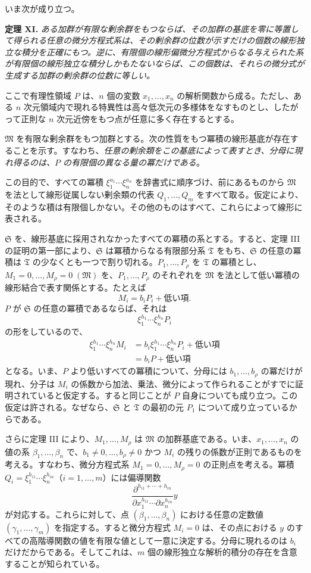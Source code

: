 いま次が成り立つ。

\textbf{定理 XI.} \emph{ある加群が有限な剰余群をもつならば、その加群の基底を零に等置して得られる任意の微分方程式系は、その剰余群の位数が示すだけの個数の線形独立な積分を正確にもつ。逆に、有限個の線形偏微分方程式からなる与えられた系が有限個の線形独立な積分しかもたないならば、この個数は、それらの微分式が生成する加群の剰余群の位数に等しい。}

ここで有理性領域 $P$ は、$n$ 個の変数 $x_1,\ldots,x_n$ の解析関数から成る。ただし、ある $n$ 次元領域内で現れる特異性は高々低次元の多様体をなすものとし、したがって正則な $n$ 次元近傍をもつ点が任意に多く存在するとする。

$\mathfrak M$ を有限な剰余群をもつ加群とする。次の性質をもつ冪積の線形基底が存在することを示す。すなわち、\emph{任意の剰余類をこの基底によって表すとき、分母に現れ得るのは、$P$ の有限個の異なる量の冪だけである}。

この目的で、すべての冪積 $\xi_1^{a_1}\cdots\xi_n^{a_n}$ を辞書式に順序づけ、前にあるものから $\mathfrak M$ を法として線形従属しない剰余類の代表 $Q_1,\ldots,Q_m$ をすべて取る。仮定により、そのような積は有限個しかない。その他のものはすべて、これらによって線形に表される。

$\mathfrak S$ を、線形基底に採用されなかったすべての冪積の系とする。すると、定理 III の証明の第一部により、$\mathfrak S$ は冪積からなる有限部分系 $\mathfrak T$ をもち、$\mathfrak S$ の任意の冪積は $\mathfrak T$ の少なくとも一つで割り切れる。$P_1,\ldots,P_\rho$ を $\mathfrak T$ の冪積とし、$M_1=0,\ldots,M_\rho=0\;(\mathfrak M)$ を、$P_1,\ldots,P_\rho$ のそれぞれを $\mathfrak M$ を法として低い冪積の線形結合で表す関係とする。たとえば
\[
 M_i=b_iP_i+\text{低い項}.
\]
$P$ が $\mathfrak S$ の任意の冪積であるならば、それは
\[
 \xi_1^{h_1}\cdots\xi_n^{h_n}P_i
\]
の形をしているので、
\[
\begin{aligned}
 \xi_1^{h_1}\cdots\xi_n^{h_n}M_i
 &=b_i\xi_1^{h_1}\cdots\xi_n^{h_n}P_i+\text{低い項}\\
 &=b_iP+\text{低い項}
\end{aligned}
\]
となる。いま、$P$ より低いすべての冪積について、分母には $b_1,\ldots,b_\rho$ の冪だけが現れ、分子は $M_i$ の係数から加法、乗法、微分によって作られることがすでに証明されていると仮定する。すると同じことが $P$ 自身についても成り立つ。この仮定は許される。なぜなら、$\mathfrak S$ と $\mathfrak T$ の最初の元 $P_1$ について成り立っているからである。

さらに定理 III により、$M_1,\ldots,M_\rho$ は $\mathfrak M$ の加群基底である。いま、$x_1,\ldots,x_n$ の値の系 $\beta_1,\ldots,\beta_n$ で、$b_1\ne0,\ldots,b_\rho\ne0$ かつ $M_i$ の残りの係数が正則であるものを考える。すなわち、微分方程式系 $M_1=0,\ldots,M_\rho=0$ の正則点を考える。冪積 $Q_i=\xi_1^{h_{i1}}\cdots\xi_n^{h_{in}}$（$i=1,\ldots,m$）には偏導関数
\[
 \frac{\partial^{h_{i1}+\cdots+h_{in}}}{\partial x_1^{h_{i1}}\cdots\partial x_n^{h_{in}}}y
\]
が対応する。これらに対して、点 $(\beta_1,\ldots,\beta_n)$ における任意の定数値 $(\gamma_1,\ldots,\gamma_m)$ を指定する。すると微分方程式 $M_i=0$ は、その点における $y$ のすべての高階導関数の値を有限な値として一意に決定する。分母に現れるのは $b_i$ だけだからである。そしてこれは、$m$ 個の線形独立な解析的積分の存在を含意することが知られている。

